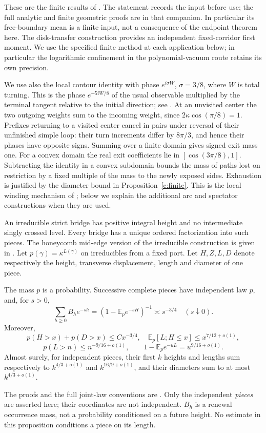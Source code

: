 These are the finite results of \cite[Theorem 1.1, Propositions 7.1, 7.4, 10.1 and Corollary 8.1]{UniformMarked}. The statement records the input
before use; the full analytic and finite geometric proofs are in that
companion. In particular its free-boundary mean is a finite input, not a
consequence of the endpoint theorem here. The disk-transfer construction
\cite[Theorem 1.1]{DiskTransfer} provides an independent fixed-corridor first moment.
We use the specified finite method at each application below; in particular
the logarithmic confinement in the polynomial-vacuum route retains its
own precision.

We use also the local contour identity with phase
$e^{i\sigma W}$, $\sigma=3/8$, where $W$ is total turning.
This is the phase $e^{-5iW/8}$ of the usual observable multiplied by
the terminal tangent relative to the initial direction;
see \cite[Section 2, Lemma 1]{DuminilCopinSmirnov2012}.
At an unvisited center the two outgoing weights sum to the incoming
weight, since $2\kappa\cos(\pi/8)=1$. Prefixes returning to a visited
center cancel in pairs under reversal of their unfinished simple loop:
their turn increments differ by $8\pi/3$, and hence their phases have
opposite signs. Summing over a finite domain gives signed exit mass one.
For a convex domain the real exit coefficients lie in
$[\cos(3\pi/8),1]$. Subtracting the identity in a convex subdomain
bounds the mass of paths lost on restriction by a fixed multiple of the
mass to the newly exposed sides. Exhaustion is justified by the diameter
bound in Proposition~\ref{c:finite}. This is the local winding mechanism
of \cite{DuminilCopinSmirnov2012}; below we explain the additional arc
and spectator constructions when they are used.

An irreducible strict bridge has positive integral height and no
intermediate singly crossed level. Every bridge has a unique ordered
factorization into such pieces. The honeycomb mid-edge version of the
irreducible construction is given in \cite[Appendix]{BeatonEtAl2014}.
Let $p(\gamma)=\kappa^{L(\gamma)}$
on irreducibles from a fixed port. Let $H,Z,L,D$ denote respectively the
height, transverse displacement, length and diameter of one piece.

\begin{proposition}\label{c:renewal}
The mass $p$ is a probability. Successive complete pieces have independent
law $p$, and, for $s>0$,
\[
 \sum_{h\ge0}B_he^{-sh}=
 (1-\mathbb E_p e^{-sH})^{-1}\asymp s^{-3/4}\quad(s\downarrow0).
\]
Moreover,
\[
 p(H>x)+p(D>x)\le Cx^{-3/4},\quad
 \mathbb E_p[L;H\le x]\le x^{7/12+o(1)},
\]
\[
 p(L>n)\le n^{-9/16+o(1)},\qquad
 1-\mathbb E_p e^{-uL}=u^{9/16+o(1)}.
\]
Almost surely, for independent pieces, their first $k$ heights and lengths
sum respectively to $k^{4/3+o(1)}$ and $k^{16/9+o(1)}$, and their
diameters sum to at most $k^{4/3+o(1)}$.
\end{proposition}
The proofs and the full joint-law conventions are
\cite[Propositions 2.2, 2.4, Remark 2.5 and Lemma 2.6]{Renewal}. Only the independent \emph{pieces}
are asserted here; their coordinates are not independent. $B_h$ is a
renewal occurrence mass, not a probability conditioned on a future height.
No estimate in this proposition conditions a piece on its length.

